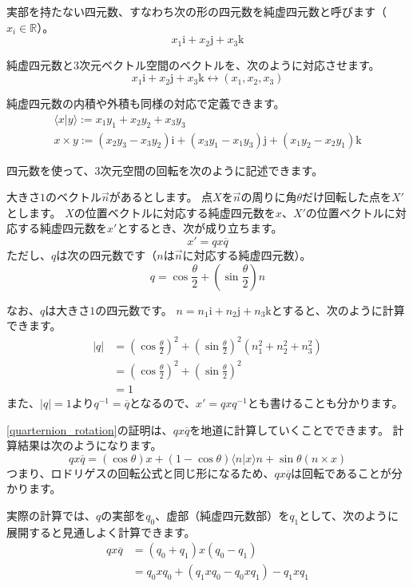 \documentclass{jlreq}
\numberwithin{equation}{section}
\newcommand{\ii}{\mathrm{i}}
\newcommand{\jj}{\mathrm{j}}
\newcommand{\kk}{\mathrm{k}}
\begin{document}
\begin{definition}
    実部を持たない四元数、すなわち次の形の四元数を純虚四元数と呼びます（\(x_i\in\mathbb{R}\)）。
    \[
        x_1\ii+x_2\jj+x_3\kk
    \]
\end{definition}

純虚四元数と3次元ベクトル空間のベクトルを、次のように対応させます。
\[
    x_1\ii+x_2\jj+x_3\kk\leftrightarrow(x_1,x_2,x_3)
\]

純虚四元数の内積や外積も同様の対応で定義できます。
\begin{gather}
    \langle x|y\rangle:=x_1y_1+x_2y_2+x_3y_3\\
    x\times y:=(x_2y_3-x_3y_2)\ii+(x_3y_1-x_1y_3)\jj+(x_1y_2-x_2y_1)\kk
\end{gather}

四元数を使って、3次元空間の回転を次のように記述できます。

\begin{theorem}\label{quarternion_rotation}
    大きさ\(1\)のベクトル\(\vec{n}\)があるとします。
    点\(X\)を\(\vec{n}\)の周りに角\(\theta\)だけ回転した点を\(X'\)とします。
    \(X\)の位置ベクトルに対応する純虚四元数を\(x\)、\(X'\)の位置ベクトルに対応する純虚四元数を\(x'\)とするとき、次が成り立ちます。
    \[
        x'=qx\overline{q}
    \]
    ただし、\(q\)は次の四元数です（\(n\)は\(\vec{n}\)に対応する純虚四元数）。
    \[
        q=\cos\frac{\theta}{2}+\left(\sin\frac{\theta}{2}\right)n
    \]
\end{theorem}

なお、\(q\)は大きさ\(1\)の四元数です。
\(n=n_1\ii+n_2\jj+n_3\kk\)とすると、次のように計算できます。
\begin{align}
    |q| & =\left(\cos\frac{\theta}{2}\right)^2+\left(\sin\frac{\theta}{2}\right)^2(n_1^2+n_2^2+n_3^2) \\
        & =\left(\cos\frac{\theta}{2}\right)^2+\left(\sin\frac{\theta}{2}\right)^2                    \\
        & =1
\end{align}
また、\(|q|=1\)より\(q^{-1}=\overline{q}\)となるので、\(x'=qxq^{-1}\)とも書けることも分かります。

\autoref{quarternion_rotation}の証明は、\(qx\overline{q}\)を地道に計算していくことでできます。
計算結果は次のようになります。
\[
    qx\overline{q}=(\cos\theta)x+(1-\cos\theta)\langle n|x\rangle n+\sin\theta(n\times x)
\]
つまり、ロドリゲスの回転公式と同じ形になるため、\(qx\overline{q}\)は回転であることが分かります。

実際の計算では、\(q\)の実部を\(q_0\)、虚部（純虚四元数部）を\(q_1\)として、次のように展開すると見通しよく計算できます。
\begin{align}
    qx\overline{q} & =(q_0+q_1)x(q_0-q_1)               \\
                   & =q_0xq_0+(q_1xq_0-q_0xq_1)-q_1xq_1
\end{align}
\end{document}
